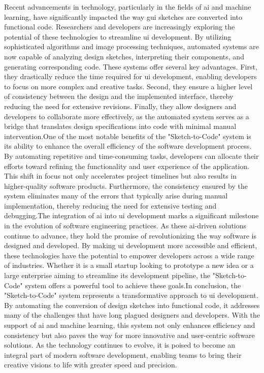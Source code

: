     Recent advancements in technology, particularly in the fields of \gls{ai} and machine learning, have significantly impacted the way \gls{gui} sketches are converted into functional code. Researchers and developers are increasingly exploring the potential of these technologies to streamline \gls{ui} development. By utilizing sophisticated algorithms and image processing techniques, automated systems are now capable of analyzing design sketches, interpreting their components, and generating corresponding code. These systems offer several key advantages. First, they drastically reduce the time required for \gls{ui} development, enabling developers to focus on more complex and creative tasks. Second, they ensure a higher level of consistency between the design and the implemented interface, thereby reducing the need for extensive revisions. Finally, they allow designers and developers to collaborate more effectively, as the automated system serves as a bridge that translates design specifications into code with minimal manual intervention.One of the most notable benefits of the "Sketch-to-Code" system is its ability to enhance the overall efficiency of the software development process. By automating repetitive and time-consuming tasks, developers can allocate their efforts toward refining the functionality and user experience of the application. This shift in focus not only accelerates project timelines but also results in higher-quality software products. Furthermore, the consistency ensured by the system eliminates many of the errors that typically arise during manual implementation, thereby reducing the need for extensive testing and debugging.The integration of \gls{ai} into \gls{ui} development marks a significant milestone in the evolution of software engineering practices. As these \gls{ai}-driven solutions continue to advance, they hold the promise of revolutionizing the way software is designed and developed. By making \gls{ui} development more accessible and efficient, these technologies have the potential to empower developers across a wide range of industries. Whether it is a small startup looking to prototype a new idea or a large enterprise aiming to streamline its development pipeline, the "Sketch-to-Code" system offers a powerful tool to achieve these goals.In conclusion, the "Sketch-to-Code" system represents a transformative approach to \gls{ui} development. By automating the conversion of design sketches into functional code, it addresses many of the challenges that have long plagued designers and developers. With the support of \gls{ai} and machine learning, this system not only enhances efficiency and consistency but also paves the way for more innovative and user-centric software solutions. As the technology continues to evolve, it is poised to become an integral part of modern software development, enabling teams to bring their creative visions to life with greater speed and precision.
    
